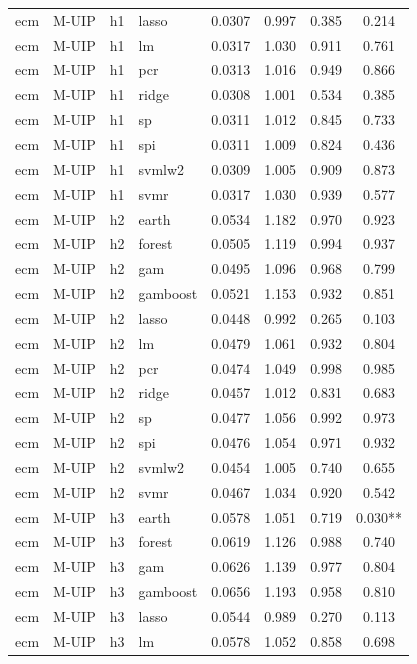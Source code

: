 \begin{ThreePartTable}
\begin{longtable}[t]{llclcccc}
ecm & M-UIP & h1 & lasso & 0.0307 & 0.997 & 0.385 & 0.214\\
ecm & M-UIP & h1 & lm & 0.0317 & 1.030 & 0.911 & 0.761\\
ecm & M-UIP & h1 & pcr & 0.0313 & 1.016 & 0.949 & 0.866\\
ecm & M-UIP & h1 & ridge & 0.0308 & 1.001 & 0.534 & 0.385\\
ecm & M-UIP & h1 & sp & 0.0311 & 1.012 & 0.845 & 0.733\\
ecm & M-UIP & h1 & spi & 0.0311 & 1.009 & 0.824 & 0.436\\
ecm & M-UIP & h1 & svmlw2 & 0.0309 & 1.005 & 0.909 & 0.873\\
ecm & M-UIP & h1 & svmr & 0.0317 & 1.030 & 0.939 & 0.577\\
\addlinespace
ecm & M-UIP & h2 & earth & 0.0534 & 1.182 & 0.970 & 0.923\\
ecm & M-UIP & h2 & forest & 0.0505 & 1.119 & 0.994 & 0.937\\
ecm & M-UIP & h2 & gam & 0.0495 & 1.096 & 0.968 & 0.799\\
ecm & M-UIP & h2 & gamboost & 0.0521 & 1.153 & 0.932 & 0.851\\
ecm & M-UIP & h2 & lasso & 0.0448 & 0.992 & 0.265 & 0.103\\
ecm & M-UIP & h2 & lm & 0.0479 & 1.061 & 0.932 & 0.804\\
ecm & M-UIP & h2 & pcr & 0.0474 & 1.049 & 0.998 & 0.985\\
ecm & M-UIP & h2 & ridge & 0.0457 & 1.012 & 0.831 & 0.683\\
ecm & M-UIP & h2 & sp & 0.0477 & 1.056 & 0.992 & 0.973\\
ecm & M-UIP & h2 & spi & 0.0476 & 1.054 & 0.971 & 0.932\\
ecm & M-UIP & h2 & svmlw2 & 0.0454 & 1.005 & 0.740 & 0.655\\
ecm & M-UIP & h2 & svmr & 0.0467 & 1.034 & 0.920 & 0.542\\
\addlinespace
ecm & M-UIP & h3 & earth & 0.0578 & 1.051 & 0.719 & 0.030**\\
ecm & M-UIP & h3 & forest & 0.0619 & 1.126 & 0.988 & 0.740\\
ecm & M-UIP & h3 & gam & 0.0626 & 1.139 & 0.977 & 0.804\\
ecm & M-UIP & h3 & gamboost & 0.0656 & 1.193 & 0.958 & 0.810\\
ecm & M-UIP & h3 & lasso & 0.0544 & 0.989 & 0.270 & 0.113\\
ecm & M-UIP & h3 & lm & 0.0578 & 1.052 & 0.858 & 0.698\\

\end{longtable}
\end{ThreePartTable}
